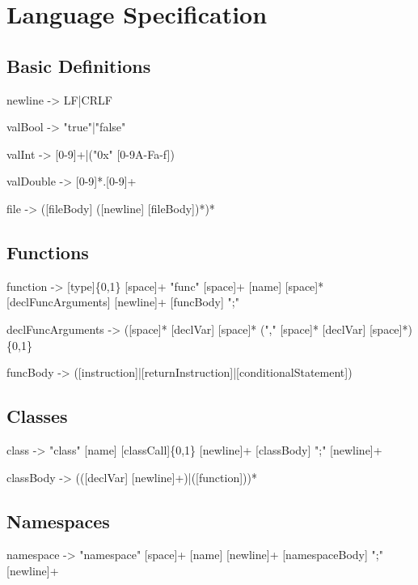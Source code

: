 \chapter{Language Specification}


\section{Basic Definitions}

\noindent newline -> LF|CRLF

\noindent valBool -> "true"|"false"

\noindent valInt -> [0-9]+|("0x" [0-9A-Fa-f])

\noindent valDouble -> [0-9]*.[0-9]+

\noindent file -> ([fileBody] ([newline] [fileBody])*)*


\section{Functions}

\noindent function -> [type]\{0,1\} [space]+ "func" [space]+ [name] [space]* [declFuncArguments] [newline]+ [funcBody] ";"

\noindent declFuncArguments -> ([space]* [declVar] [space]* ("," [space]* [declVar] [space]*)\{0,1\}

\noindent funcBody -> ([instruction]|[returnInstruction]|[conditionalStatement])


\section{Classes}

\noindent class -> "class" [name] [classCall]\{0,1\} [newline]+ [classBody] ";" [newline]+

\noindent classBody -> (([declVar] [newline]+)|([function]))*


\section{Namespaces}

\noindent namespace -> "namespace" [space]+ [name] [newline]+ [namespaceBody] ";" [newline]+


